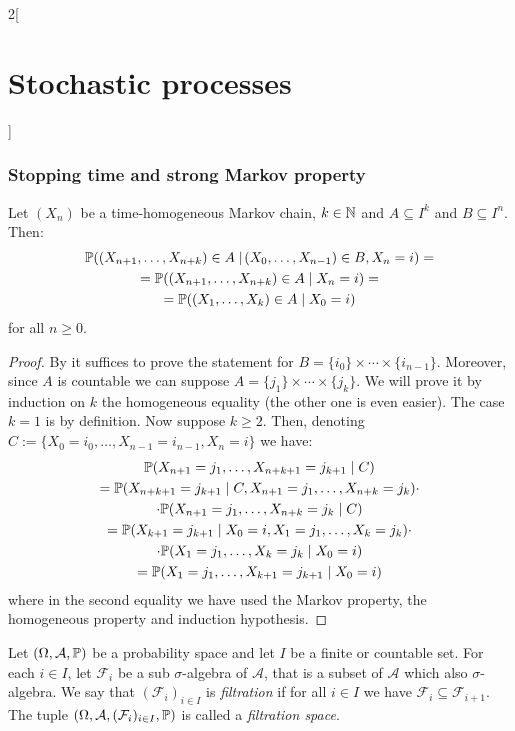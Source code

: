 \documentclass[../../../main_math.tex]{subfiles}
\begin{document}
\begin{multicols}{2}[\section{Stochastic processes}]
  \subsubsection{Stopping time and strong Markov property}
  \begin{proposition}\label{SP:MarkovImproved}
    Let $(X_n)$ be a time-homogeneous Markov chain, $k\in\mathbb{N}$ and $A\subseteq I^k$ and $B\subseteq I^n$. Then:
    \begin{multline*}
      \mathbb{P}((X_{n+1},\ldots,X_{n+k})\in A\mid\!(X_0,\ldots,X_{n-1})\in B,X_n=i)=\\
      =\mathbb{P}((X_{n+1},\ldots,X_{n+k})\in A\mid X_n=i)=\\
      =\mathbb{P}((X_{1},\ldots,X_{k})\in A\mid X_0=i)
    \end{multline*}
    for all $n\geq 0$.
  \end{proposition}
  \begin{proof}
    By  it suffices to prove the statement for $B=\{i_0\}\times\cdots\times\{i_{n-1}\}$. Moreover, since $A$ is countable we can suppose $A=\{j_1\}\times\cdots\times\{j_k\}$. We will prove it by induction on $k$ the homogeneous equality (the other one is even easier). The case $k=1$ is by definition. Now suppose $k\geq 2$. Then, denoting $C:=\{X_0=i_0,\ldots,X_{n-1}=i_{n-1},X_n=i\}$ we have:
    \begin{multline*}
      \mathbb{P}(X_{n+1}=j_1,\ldots,X_{n+k+1}=j_{k+1}\mid C) \\
      =\mathbb{P}(X_{n+k+1}=j_{k+1}\mid C,X_{n+1}=j_1,\ldots,X_{n+k}=j_k)\cdot\\
      \cdot\mathbb{P}(X_{n+1}=j_1,\ldots,X_{n+k}=j_k\mid C) \\
      =\mathbb{P}(X_{k+1}=j_{k+1}\mid X_0=i,X_{1}=j_1,\ldots,X_{k}=j_k)\cdot\\
      \cdot\mathbb{P}(X_{1}=j_1,\ldots,X_{k}=j_k\mid X_0=i) \\
      =\mathbb{P}(X_{1}=j_1,\ldots,X_{k+1}=j_{k+1}\mid X_0=i)
    \end{multline*}
    where in the second equality we have used the Markov property, the homogeneous property and induction hypothesis.
  \end{proof}
  \begin{definition}
    Let $(\Omega,\mathcal{A},\mathbb{P})$ be a probability space and let $I$ be a finite or countable set. For each $i\in I$, let $\mathcal{F}_i$ be a sub $\sigma$-algebra of $\mathcal{A}$, that is a subset of $\mathcal{A}$ which also $\sigma$-algebra. We say that $(\mathcal{F}_i)_{i\in I}$ is \emph{filtration} if for all $i\in I$ we have $\mathcal{F}_i\subseteq\mathcal{F}_{i+1}$. The tuple $(\Omega,\mathcal{A},(\mathcal{F}_i)_{i\in I},\mathbb{P})$ is called a \emph{filtration space}.

\end{definition}
\end{multicols}
\end{document}
